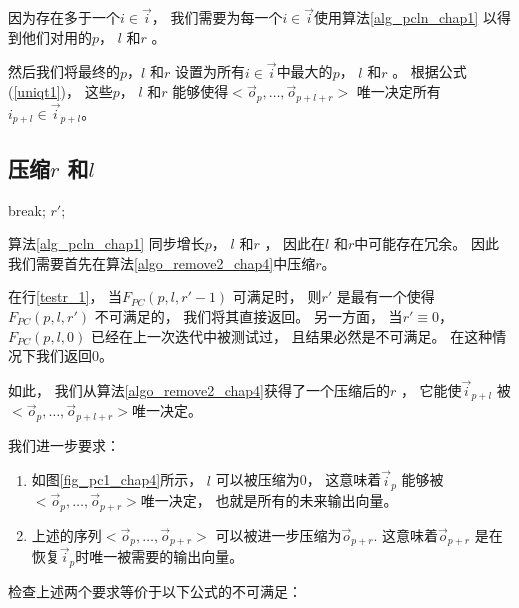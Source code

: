 因为存在多于一个$i\in \vec{i}$，
我们需要为每一个$i\in \vec{i}$使用算法\ref{alg_pcln_chap1}
以得到他们对用的$p$， $l$ 和$r$ 。

然后我们将最终的$p$，$l$ 和$r$ 设置为所有$i\in \vec{i}$中最大的$p$， $l$ 和$r$ 。
根据公式(\ref{uniqt1})，
这些$p$， $l$ 和$r$ 能够使得$<\vec{o}_{p},\dots,\vec{o}_{p+l+r}>$ 唯一决定所有$i_{p+l}\in \vec{i}_{p+l}$。


\subsection{压缩$r$ 和$l$}\label{reduceing}

\begin{algorithm}[t]
\begin{algorithmic}[1]
\label{testr_1}
  \STATE  break;
  \ENDIF
\ENDFOR
\RETURN $r'$;
\caption{$RemoveRedundancy(p,l,r)$}
\label{algo_remove2_chap4}
\end{algorithmic}
\end{algorithm}



算法\ref{alg_pcln_chap1} 同步增长$p$， $l$ 和$r$ ，
因此在$l$ 和$r$中可能存在冗余。
因此我们需要首先在算法\ref{algo_remove2_chap4}中压缩$r$。


在行\ref{testr_1}，
当$F_{PC}(p,l,r'-1)$ 可满足时，
则$r'$ 是最有一个使得$F_{PC}(p,l,r')$ 不可满足的，
我们将其直接返回。
另一方面，
当$r'\equiv 0$，
$F_{PC}(p,l,0)$ 已经在上一次迭代中被测试过，
且结果必然是不可满足。
在这种情况下我们返回$0$。


如此，
我们从算法\ref{algo_remove2_chap4}获得了一个压缩后的$r$ ，
它能使$\vec{i}_{p+l}$ 被$<\vec{o}_{p},\dots,\vec{o}_{p+l+r}>$唯一决定。

我们进一步要求：
\begin{enumerate}
 \item 如图\ref{fig_pc1_chap4}所示，
 $l$ 可以被压缩为0，
 这意味着$\vec{i}_{p}$ 能够被$<\vec{o}_{p},\dots,\vec{o}_{p+r}>$唯一决定，
 也就是所有的未来输出向量。
 \item 上述的序列$<\vec{o}_{p},\dots,\vec{o}_{p+r}>$
 可以被进一步压缩为$\vec{o}_{p+r}$.
 这意味着$\vec{o}_{p+r}$ 是在恢复$\vec{i}_p$时唯一被需要的输出向量。
\end{enumerate}

检查上述两个要求等价于以下公式的不可满足：

